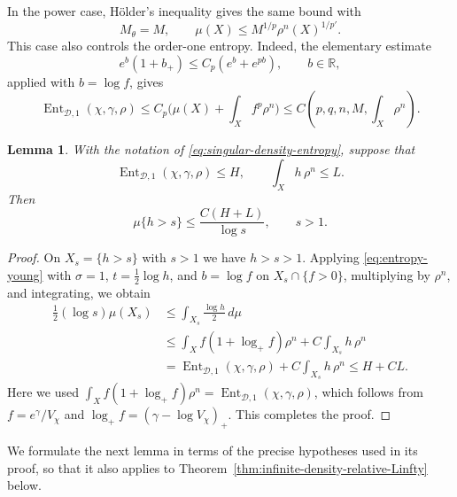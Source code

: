\documentclass[oneside,english,letterpaper]{amsart}
\numberwithin{equation}{section}
\theoremstyle{plain}
\newtheorem{lem}[thm]{Lemma}
\theoremstyle{definition}
\theoremstyle{remark}
\begin{document}
In the power case, H\"older's inequality gives the same bound with
\[
M_\theta=M,\qquad
\mu(X)\leq M^{1/p}\rho^n(X)^{1/p'}.
\]
This case also controls the order-one entropy. Indeed, the elementary
estimate
\[
e^b(1+b_+)\leq C_p(e^b+e^{pb}),\qquad b\in\mathbb R,
\]
applied with $b=\log f$, gives
\[
\operatorname{Ent}_{\mathcal D,1}(\chi,\gamma,\rho)
\leq C_p\bigl(\mu(X)+\int_Xf^p\rho^n\bigr)
\leq C(p,q,n,M,\int_X\rho^n).
\]

\begin{lem}
	\label{lem:fasterdecayphi}
	With the notation of \eqref{eq:singular-density-entropy}, suppose
	that
	\[
	\operatorname{Ent}_{\mathcal D,1}(\chi,\gamma,\rho)\leq H,
	\qquad
	\int_Xh\,\rho^n\leq L.
	\]
	Then
	\begin{equation}
		\label{eq:entropy-tail}
		\mu\{h>s\}\leq\frac{C(H+L)}{\log s},
		\qquad s>1.
	\end{equation}
\end{lem}
\begin{proof}
	On $X_s=\{h>s\}$ with $s>1$ we have $h>s>1$.
	Applying \eqref{eq:entropy-young} with $\sigma=1$,
	$t=\frac12\log h$, and $b=\log f$ on $X_s\cap\{f>0\}$, multiplying by $\rho^n$, and integrating, we obtain
	$$
	\begin{aligned}
	\tfrac12(\log s)\mu(X_s)
&\leq\int_{X_s}\frac{\log h}{2}\,d\mu\\
&\leq\int_Xf(1+\log_+f)\rho^n
+C\int_{X_s}h\,\rho^n\\
&=\operatorname{Ent}_{\mathcal D,1}(\chi,\gamma,\rho)
+C\int_{X_s}h\,\rho^n
\leq H+CL.
	\end{aligned}
	$$
Here we used
$\int_Xf(1+\log_+f)\rho^n
=\operatorname{Ent}_{\mathcal D,1}(\chi,\gamma,\rho)$,
which follows from $f=e^\gamma/V_\chi$ and
$\log_+f=(\gamma-\log V_\chi)_+$.
	This completes the proof.
\end{proof}

We formulate the next lemma in terms of the precise hypotheses used
in its proof, so that it also applies to
Theorem~\ref{thm:infinite-density-relative-Linfty} below.
\end{document}
